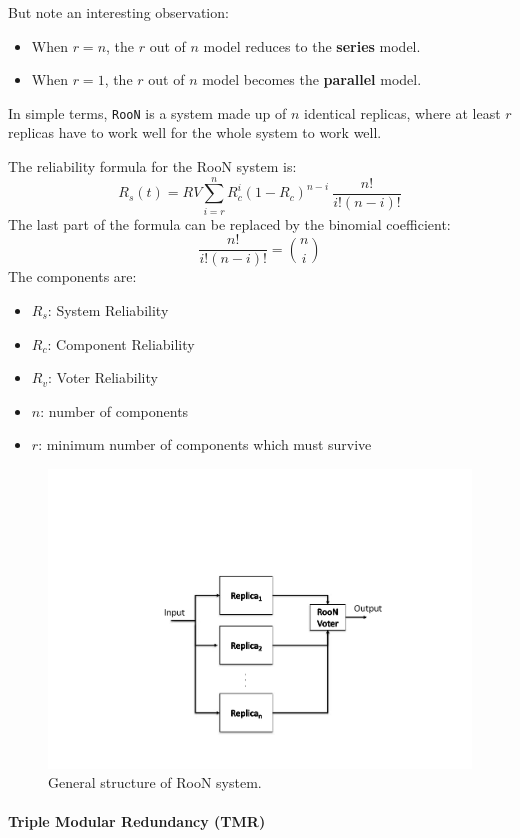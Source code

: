 \highspace
But note an interesting observation:\cite{nist8184Model}
\begin{itemize}
    \item When $r=n$, the $r$ out of $n$ model reduces to the \textbf{series} model.
    \item When $r=1$, the $r$ out of $n$ model becomes the \textbf{parallel} model.
\end{itemize}

\highspace
In simple terms, \texttt{RooN} is a system made up of $n$ identical replicas, where at least $r$ replicas have to work well for the whole system to work well.

\highspace
The reliability formula for the RooN system is:
\begin{equation}
	R_{s}\left(t\right) = RV \displaystyle\sum_{i=r}^{n} R_{c}^{i} \left(1 - R_{c}\right)^{n-i} \: \dfrac{n!}{i!\left(n-i\right)!}
\end{equation}
The last part of the formula can be replaced by the binomial coefficient:
\begin{equation*}
	\dfrac{n!}{i!\left(n-i\right)!} = \binom{n}{i}
\end{equation*}
The components are:
\begin{multicols}{2}
	\begin{itemize}
		\item $R_{s}$: System Reliability
		
		\item $R_{c}$: Component Reliability
		
		\item $R_{v}$: Voter Reliability
		
		\item $n$: number of components
		
		\item $r$: minimum number of components which must survive
	\end{itemize}
\end{multicols}
\begin{figure}[!htp]
	\centering
	\includegraphics[width=.6\textwidth]{img/roon-1.pdf}
	\caption{General structure of RooN system.}
\end{figure}

\newpage

\paragraph{Triple Modular Redundancy (TMR)}